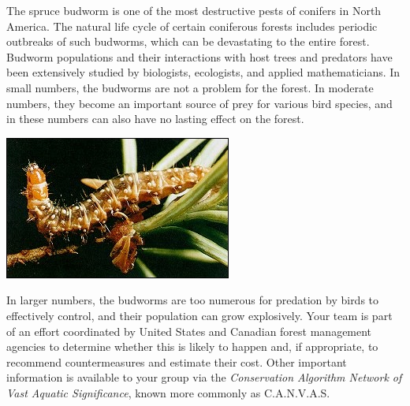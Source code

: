 \documentclass{article}
\begin{document}
\begin{minipage}[t][2.2in]{0.65\textwidth}
        \vspace{0pt}
    The spruce budworm is one of the most destructive pests of conifers in
    North America. The natural life cycle of certain coniferous forests
    includes periodic outbreaks of such budworms, which can be devastating to
    the entire forest. Budworm populations and their interactions with host
    trees and predators have been extensively studied by biologists,
    ecologists, and applied mathematicians. In small numbers, the budworms are
    not a problem for the forest. In moderate numbers, they become an
    important source of prey for various bird species, and in these numbers
    can also have no lasting effect on the forest.
    \end{minipage} \hspace{1em}
    \begin{minipage}[t][2.2in]{0.32\textwidth}
        \vspace{0pt}
        \centering
        \includegraphics[width=\linewidth, keepaspectratio=1]{wbw-cov.jpg}
    \end{minipage}
    In larger numbers, the budworms are too numerous for predation by birds to
    effectively control, and their population can grow explosively. Your team
    is part of an effort coordinated by United States and Canadian forest
    management agencies to determine whether this is likely to happen and, if
    appropriate, to recommend countermeasures and estimate their cost. Other
    important information is available to your group via the
    \emph{Conservation Algorithm Network of Vast Aquatic Significance}, known
    more commonly as C.A.N.V.A.S.
\end{document}
